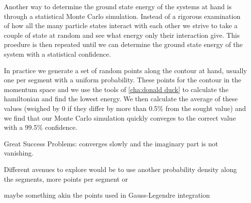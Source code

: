 Another way to determine the ground state energy of the systems at hand is through a statistical Monte Carlo simulation. 
Instead of a rigorous examination of how all the many particle states interact with each other we strive to take a couple of state at random and see what energy only their interaction give. 
This proedure is then repeated until we can determine the ground state energy of the system with a statistical confidence.

In practice we generate a set of random points along the contour at hand, usually one per segment with a uniform probability. 
These points for the contour in the momentum space and we use the tools of \cref{cha:donald duck} to calculate the hamiltonian and find the lowest energy. 
We then calculate the average of these values (weighed by 0 if they differ by more than 0.5\% from the sought value) and we find that our Monte Carlo simulation quickly conveges to the correct value with a 99.5\% confidence.

Great Success
Problems: converges slowly and the imaginary part is not vanishing.

Different avenues to explore would be to use another probability density along the segments, more points per segment or 

 maybe something akin the points used in Gauss-Legendre integration